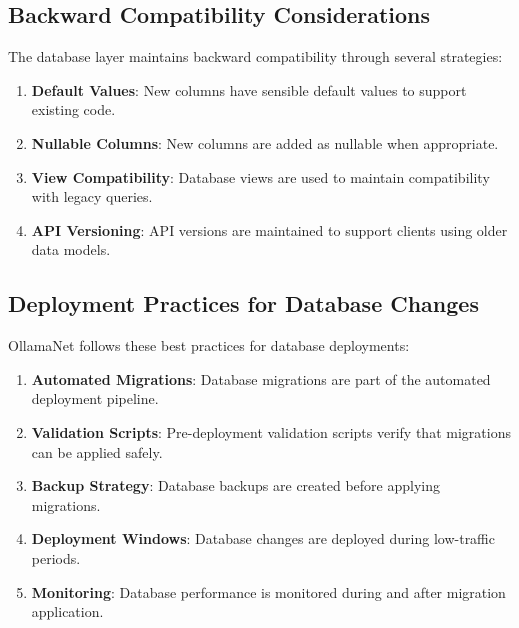 \subsection{Backward Compatibility Considerations}

The database layer maintains backward compatibility through several strategies:

\begin{enumerate}
   \item \textbf{Default Values}: New columns have sensible default values to support existing code.

   \item \textbf{Nullable Columns}: New columns are added as nullable when appropriate.

   \item \textbf{View Compatibility}: Database views are used to maintain compatibility with legacy queries.

   \item \textbf{API Versioning}: API versions are maintained to support clients using older data models.
\end{enumerate}

\subsection{Deployment Practices for Database Changes}

OllamaNet follows these best practices for database deployments:

\begin{enumerate}
   \item \textbf{Automated Migrations}: Database migrations are part of the automated deployment pipeline.

   \item \textbf{Validation Scripts}: Pre-deployment validation scripts verify that migrations can be applied safely.

   \item \textbf{Backup Strategy}: Database backups are created before applying migrations.

   \item \textbf{Deployment Windows}: Database changes are deployed during low-traffic periods.

   \item \textbf{Monitoring}: Database performance is monitored during and after migration application.
\end{enumerate}


